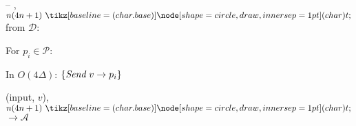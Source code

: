 
\begin{bbox}[title={$\F_{\msf{bcast}} (\mathcal{D}, \mathcal{P}=p_1,...,p_n)$}]

-- \OnInput {}, $n(4n+1) \token$ from $\mathcal{D}$:

	\qquad For $p_i \in \mathcal{P}$:
		
		\qqquad In $O(4 \Delta)$: $\{\emph{Send}~ v \rightarrow p_i\}$

	\qquad \Leak (input, $v$), $n(4n+1) \token$ $\rightarrow \mathcal{A}$

\end{bbox}
